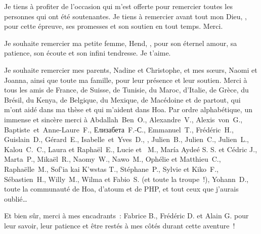  Je tiens à profiter de l'occasion qui m'est
offerte pour remercier toutes les personnes qui ont été soutenantes. Je tiens à
remercier avant tout mon Dieu, , pour cette épreuve,
ses promesses et son soutien en tout temps. Merci.

Je souhaite remercier ma petite femme, Hend, , pour son
éternel amour, sa patience, son écoute et son infini tendresse. Je t'aime.

Je souhaite remercier mes parents, Nadine et Christophe, et mes sœurs, Naomi et
Joanna, ainsi que toute ma famille, pour leur présence et leur soutien.
%
Merci à tous les amis de France, de Suisse, de Tunisie, du Maroc, d'Italie, de
Grèce, du Brésil, du Kenya, de Belgique, du Mexique, de Macédoine et de partout,
qui m'ont aidé dans ma thèse et qui m'aident dans Hoa. Par ordre alphabétique,
un immense et sincère merci à
Abdallah~Ben~O.,
Alexandre~V.,
Alexis~von~G.,
Baptiste~et~Anne-Laure~F.,
\foreignlanguage{russian}{Елизабета}~F.-\foreignlanguage{russian}{С}.,
Emmanuel~T.,
Frédéric~H.,
Guislain~D.,
Gérard~E.,
Isabelle~et~Yves~D.,
,
Julien~B.,
Julien~C.,
Julien~L.,
Kalou~C.~C.,
Laura et Raphaël~E.,
Lucie et ~M.,
\foreignlanguage{spanish}{María Aydeé} S. S. et Cédric J.,
Marta~P.,
Mikaël~R.,
\foreignlanguage{english}{Naomy~W.},
Nawo~M.,
Ophélie et Matthieu~C.,
Raphaëlle~M.,
\foreignlanguage{greek}{\textgreek{Sof'ia kai K'wstas T.}},
Stéphane~P.,
Sylvie et Kiko~F.,
Sébastien~H.,
Willy~M.,
Wilma et \foreignlanguage{italian}{Fabio}~S. (et toute la troupe~!),
Yohann~D.,
toute la communauté de Hoa, d'atoum et de PHP,
et tout ceux que j'aurais oublié…

Et bien sûr, merci à mes encadrants~: Fabrice B., Frédéric D. et Alain G. pour
leur savoir, leur patience et être restés à mes côtés durant cette aventure~!

